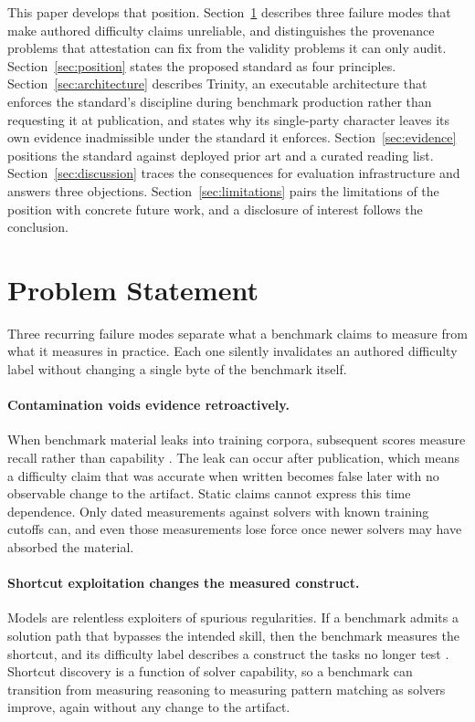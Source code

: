 \documentclass[11pt]{article}
\begin{document}
This paper develops that position. Section~\ref{sec:problem} describes three failure modes that make authored difficulty claims unreliable, and distinguishes the provenance problems that attestation can fix from the validity problems it can only audit. Section~\ref{sec:position} states the proposed standard as four principles. Section~\ref{sec:architecture} describes Trinity, an executable architecture that enforces the standard's discipline during benchmark production rather than requesting it at publication, and states why its single-party character leaves its own evidence inadmissible under the standard it enforces. Section~\ref{sec:evidence} positions the standard against deployed prior art and a curated reading list. Section~\ref{sec:discussion} traces the consequences for evaluation infrastructure and answers three objections. Section~\ref{sec:limitations} pairs the limitations of the position with concrete future work, and a disclosure of interest follows the conclusion.

\section{Problem Statement}
\label{sec:problem}

Three recurring failure modes separate what a benchmark claims to measure from what it measures in practice. Each one silently invalidates an authored difficulty label without changing a single byte of the benchmark itself.

\paragraph{Contamination voids evidence retroactively.}
When benchmark material leaks into training corpora, subsequent scores measure recall rather than capability \citep{sainz2023contamination}. The leak can occur after publication, which means a difficulty claim that was accurate when written becomes false later with no observable change to the artifact. Static claims cannot express this time dependence. Only dated measurements against solvers with known training cutoffs can, and even those measurements lose force once newer solvers may have absorbed the material.

\paragraph{Shortcut exploitation changes the measured construct.}
Models are relentless exploiters of spurious regularities. If a benchmark admits a solution path that bypasses the intended skill, then the benchmark measures the shortcut, and its difficulty label describes a construct the tasks no longer test \citep{yuan2024shortcut}. Shortcut discovery is a function of solver capability, so a benchmark can transition from measuring reasoning to measuring pattern matching as solvers improve, again without any change to the artifact.
\end{document}
